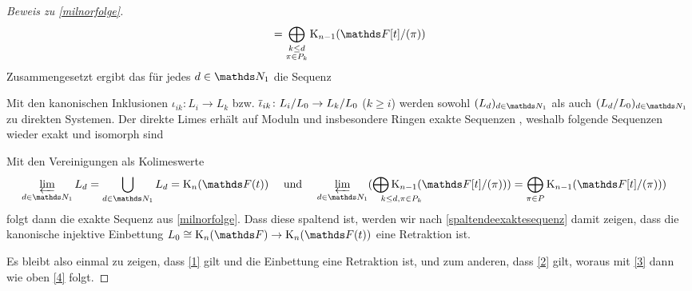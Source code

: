 \documentclass[ngerman,fontsize=11pt, paper=a4, parskip=half, titlepage=true, toc=bib]{scrartcl}
\begin{document}
\begin{proof}[Beweis zu \ref{milnorfolge}]
\begin{align}
    = \bigoplus_{\substack{k\leq d\\\pi\in P_k}}
    \K_{n-1}(\Ftpi)
  \end{align}
  Zusammengesetzt ergibt das für jedes $d\in\N_1$ die Sequenz
  \begin{center}
  \end{center}
  Mit den kanonischen Inklusionen $\iota_{ik}\colon L_i\to L_k$ 
  bzw. $\overline{\iota}_{ik}\colon L_i/L_0\to L_k/L_0$ ($k\geq i$) werden
  sowohl $(L_d)_{d\in\N_1}$ als auch $(L_d/L_0)_{d\in\N_1}$
  zu direkten Systemen.
  Der direkte Limes erhält auf Moduln und insbesondere Ringen exakte
  Sequenzen 
  \cite[siehe][III. §6.2, Prop. 3]{bourbaki},
  weshalb folgende Sequenzen wieder exakt und isomorph sind
  \begin{center}
  \end{center}
  Mit den Vereinigungen als Kolimeswerte
  \begin{align*}
    \varprojlim_{d\in\N_1}L_d
    &=\bigcup_{d\in\N_1}L_d=\KnFt
    &&\text{ und } 
    &\varprojlim_{d\in\N_1}
      (\bigoplus_{\mathrlap{k\leq d, \pi\in P_k}}
      \K_{n-1}(\Ftpi))
    &=\bigoplus_{\pi\in P}
      \K_{n-1}(\Ftpi))
  \end{align*}
  folgt dann die exakte Sequenz aus \ref{milnorfolge}.
  Dass diese spaltend ist, werden wir nach
  \ref{spaltendeexaktesequenz} damit zeigen, dass
  die kanonische injektive Einbettung $L_0\cong\KnF\to\KnFt$ 
  eine Retraktion ist.

  Es bleibt also einmal zu zeigen, dass \ref{1} gilt und die Einbettung eine
  Retraktion ist, und zum anderen, dass \ref{2} gilt, woraus mit \ref{3} dann wie
  oben \ref{4} folgt.
  

\end{proof}
\end{document}
